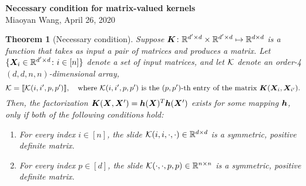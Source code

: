 \documentclass[11pt]{article}
\theoremstyle{plain}
\newtheorem{thm}{Theorem}[section]
\theoremstyle{definition}
\begin{document}
\begin{center}
{\bf \Large Necessary condition for matrix-valued kernels}\\
Miaoyan Wang, April 26, 2020\\
\vspace{1cm}
\end{center}

\begin{thm}[Necessary condition] Suppose $\bm K\colon \mathbb{R}^{d'\times d}\times \mathbb{R}^{d'\times d} \mapsto \mathbb{R}^{d\times d}$ is a function that takes as input a pair of matrices and produces a matrix. Let $\{\bm X_i\in\mathbb{R}^{d'\times d}\colon i\in[n]\}$ denote a set of input matrices, and let $\mathcal{K}$ denote an order-4 $(d,d,n,n)$-dimensional array,
\[
\mathcal{K}=\llbracket \mathcal{K}(i,i',p,p') \rrbracket,\quad \text{where $\mathcal{K}(i,i',p,p')$ is the $(p,p')$-th entry of the matrix $\bm K(\bm X_i, \bm X_{i'})$}. 
\]
Then, the factorization $\bm K(\bm X,\bm X')=\bm{h}(\bm X)^T\bm{h}(\bm X')$ exists for some mapping $\bm{h}$, only if both of the following conditions hold:
\begin{enumerate}
\item [(1)] For every index $i\in[n]$, the slide $\mathcal{K}(i, i, \cdot,\cdot)\in\mathbb{R}^{d\times d}$ is a symmetric, positive definite matrix.
\item [(2)] For every index $p\in[d]$, the slide $\mathcal{K}(\cdot,\cdot,p,p)\in\mathbb{R}^{n\times n}$ is a symmetric, positive definite matrix. 

\end{enumerate}
\end{thm}



\end{document}
